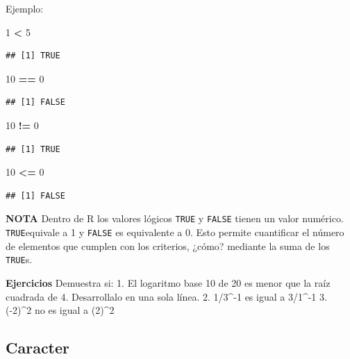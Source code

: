 \documentclass[
]{book}
\newenvironment{Shaded}{\begin{snugshade}}{\end{snugshade}}
\newcommand{\DecValTok}[1]{\textcolor[rgb]{0.00,0.00,0.81}{#1}}
\newcommand{\SpecialCharTok}[1]{\textcolor[rgb]{0.81,0.36,0.00}{\textbf{#1}}}
\begin{document}
Ejemplo:

\begin{Shaded}
\begin{Highlighting}[]
\DecValTok{1} \SpecialCharTok{\textless{}} \DecValTok{5}
\end{Highlighting}
\end{Shaded}

\begin{verbatim}
## [1] TRUE
\end{verbatim}

\begin{Shaded}
\begin{Highlighting}[]
\DecValTok{10} \SpecialCharTok{==} \DecValTok{0}    
\end{Highlighting}
\end{Shaded}

\begin{verbatim}
## [1] FALSE
\end{verbatim}

\begin{Shaded}
\begin{Highlighting}[]
\DecValTok{10} \SpecialCharTok{!=} \DecValTok{0}   
\end{Highlighting}
\end{Shaded}

\begin{verbatim}
## [1] TRUE
\end{verbatim}

\begin{Shaded}
\begin{Highlighting}[]
\DecValTok{10} \SpecialCharTok{\textless{}=} \DecValTok{0}   
\end{Highlighting}
\end{Shaded}

\begin{verbatim}
## [1] FALSE
\end{verbatim}

\textbf{NOTA} Dentro de R los valores lógicos \texttt{TRUE} y \texttt{FALSE} tienen un valor numérico. \texttt{TRUE}equivale a 1 y \texttt{FALSE} es equivalente a 0. Esto permite cuantificar el número de elementos que cumplen con los criterios, ¿cómo? mediante la suma de los \texttt{TRUE}s.

\textbf{Ejercicios}
Demuestra si:
1. El logaritmo base 10 de 20 es menor que la raíz cuadrada de 4. Desarrollalo en una sola línea.
2. 1/3\^{}-1 es igual a 3/1\^{}-1
3. (-2)\^{}2 no es igual a (2)\^{}2

\subsection{Caracter}\label{caracter}
\end{document}
